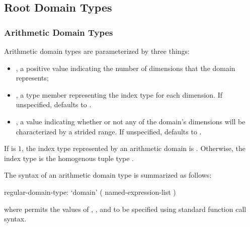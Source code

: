 \subsection{Root Domain Types}
\label{Root_Domain_Types}


\subsubsection{Arithmetic Domain Types}

Arithmetic domain types are parameterized by three things:
\begin{itemize}

 \item {}, a positive  value indicating the number
of dimensions that the domain represents;

 \item {}, a type member representing the index type for
each dimension.  If unspecified,  defaults
to .


 \item {}, a  value indicating whether or not
any of the domain's dimensions will be characterized by a strided
range.  If unspecified,  defaults to .

\end{itemize}

If  is $1$, the index type represented by an arithmetic
domain is .  Otherwise, the index type is the homogenous
tuple type .


The syntax of an arithmetic domain type is summarized as follows:

\begin{syntax}
regular-domain-type:
  `domain' ( named-expression-list )
\end{syntax}

\noindent where  permits the values of
, , and  to be specified
using standard function call syntax.

%
%


